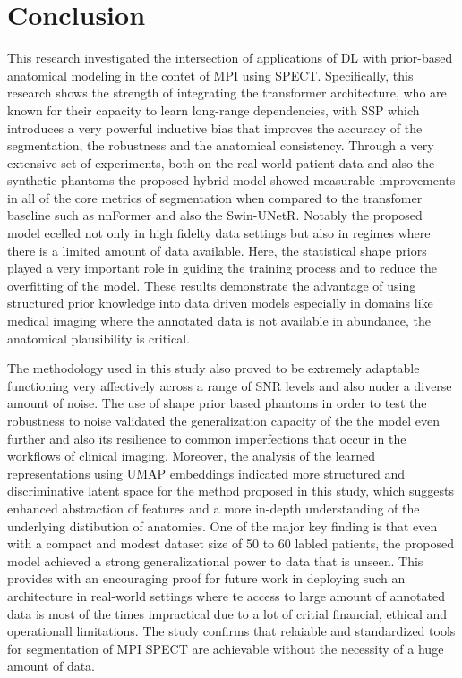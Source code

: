 \chapter{Conclusion}
\label{ch:conclusion}

This research investigated the intersection of applications of DL with prior-based anatomical modeling in the contet of MPI using SPECT. Specifically, this research shows the strength of integrating the transformer architecture, who are known for their capacity to learn long-range dependencies, with SSP which introduces a very powerful inductive bias that improves the accuracy of the segmentation, the robustness and the anatomical consistency. Through a very extensive set of experiments, both on the real-world patient data and also the synthetic phantoms the proposed hybrid model showed measurable improvements in all of the core metrics of segmentation when compared to the transfomer baseline such as nnFormer and also the Swin-UNetR. Notably the proposed model ecelled not only in high fidelty data settings but also in regimes where there is a limited amount of data available. Here, the statistical shape priors played a very important role in guiding the training process and to reduce the overfitting of the model. These results demonstrate the advantage of using structured prior knowledge into data driven models especially in domains like medical imaging where the annotated data is not available in abundance, the anatomical plausibility is critical.

The methodology used in this study also proved to be extremely adaptable functioning very affectively across a range of SNR levels and also nuder a diverse amount of noise. The use of shape prior based phantoms in order to test the robustness to noise validated the generalization capacity of the the model even further and also its resilience to common imperfections that occur in the workflows of clinical imaging. Moreover, the analysis of the learned representations using UMAP embeddings indicated more structured and discriminative latent space for the method proposed in this study, which suggests enhanced abstraction of features and a more in-depth understanding of the underlying distibution of anatomies. One of the major key finding is that even with a compact and modest dataset size of 50 to 60 labled patients, the proposed model achieved a strong generalizational power to data that is unseen. This provides with an encouraging proof for future work in deploying such an architecture in real-world settings where te access to large amount of annotated data is most of the times impractical due to a lot of critial financial, ethical and operationall limitations. The study confirms that relaiable and standardized tools for segmentation of MPI SPECT are achievable without the necessity of a huge amount of data.

